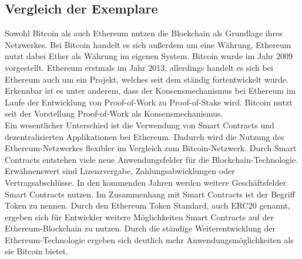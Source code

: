 	\subsection{Vergleich der Exemplare}
	
		Sowohl Bitcoin als auch Ethereum nutzen die Blockchain als Grundlage ihres Netzwerkes. Bei Bitcoin handelt es sich außerdem um eine Währung, Ethereum nutzt dabei Ether als Währung im eigenen System. Bitcoin wurde im Jahr 2009 vorgestellt. Ethereum erstmals im Jahr 2013, allerdings handelt es sich bei Ethereum auch um ein Projekt, welches seit dem ständig fortentwickelt wurde. Erkennbar ist es unter anderem, dass der Konsensmechanismus bei Ethereum im Laufe der Entwicklung von Proof-of-Work zu Proof-of-Stake wird. Bitcoin nutzt seit der Vorstellung Proof-of-Work als Konsensmechanismus.\\
		Ein wesentlicher Unterschied ist die Verwendung von Smart Contracts und dezentralisierten Applikationen bei Ethereum. Dadurch wird die Nutzung des Ethereum-Netzwerkes flexibler im Vergleich zum Bitcoin-Netzwerk. Durch Smart Contracts entstehen viele neue Anwendungsfelder für die Blockchain-Technologie. Erwähnenswert sind Lizenzvergabe, Zahlungsabwicklungen oder Vertragsabschlüsse. In den kommenden Jahren werden weitere Geschäftsfelder Smart Contracts nutzen. Im Zusammenhang mit Smart Contracts ist der Begriff Token zu nennen. Durch den Ethereum Token Standard, auch ERC20 \citep{ERC20 }genannt, ergeben sich für Entwickler weitere Möglichkeiten Smart Contracts auf der Ethereum-Blockchain zu nutzen. Durch die ständige Weiterentwicklung der Ethereum-Technologie ergeben sich deutlich mehr Anwendungsmöglichkeiten als sie Bitcoin bietet.  
